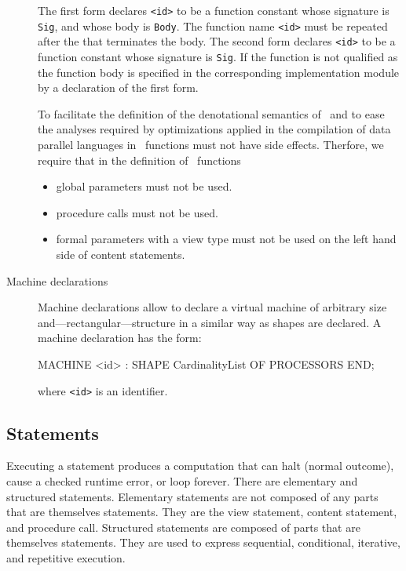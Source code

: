 \begin{description}
The first form declares {\tt <id>} to be a function constant whose
signature is {\tt Sig}, and whose body is {\tt Body}. The function
name {\tt <id>} must be repeated after the  that terminates the
body. The second form declares {\tt <id>} to be a function constant
whose signature is {\tt Sig}. If the function is not qualified as
 the function body is specified in the corresponding
implementation module by a declaration of the first form.

To facilitate the definition of the denotational semantics of
\Booster\ and to ease the analyses required by optimizations applied
in the compilation of data parallel languages in \Booster\ functions
must not have side effects. Therfore, we require that in the
definition of \Booster\ functions

\begin{itemize}

\item global parameters must not be used.

\item procedure calls must not be used.

\item formal parameters with a view type must not be used on the left
hand side of content statements.

\end{itemize}

\item[Machine declarations]

Machine declarations allow to declare a virtual machine of arbitrary
size and---rectangular---structure in a similar way as shapes are
declared. A machine declaration has the form:

\begin{frag}
MACHINE <id> : SHAPE CardinalityList OF PROCESSORS END;
\end{frag}

where {\tt <id>} is an identifier. 

\end{description}

\subsection*{Statements}

Executing a statement produces a computation that can halt (normal
outcome), cause a checked runtime error, or loop forever. There are
elementary and structured statements. Elementary statements are not
composed of any parts that are themselves statements. They are the
view statement, content statement, and procedure call. Structured
statements are composed of parts that are themselves statements. They
are used to express sequential, conditional, iterative, and repetitive
execution.

